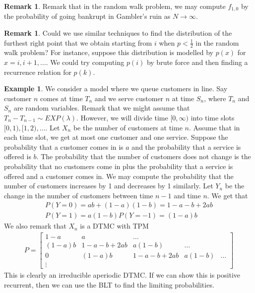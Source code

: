 \documentclass[11pt]{amsart}
\theoremstyle{definition}
\newtheorem{remark}[theorem]{Remark}
\newtheorem{example}[theorem]{Example}
\numberwithin{equation}{section}
\begin{document}
 \begin{remark}
     Remark that in the random walk problem, we may compute $f_{1,0}$ by the probability of going bankrupt in Gambler's ruin as $N\to\infty$.
 \end{remark}
 \begin{remark}
     Could we use similar techniques to find the distribution of the furthest right point that we obtain starting from $i$ when $p<\frac{1}{2}$ in the random walk problem? For instance, suppose this distribution is modelled by $p(x)$ for $x=i,i+1,\ldots$. We could try computing $p(i)$ by brute force and then finding a recurrence relation for $p(k)$.
 \end{remark}
 \begin{example}
     We consider a model where we queue customers in line. Say customer $n$ comes at time $T_n$ and we serve  customer $n$ at time $S_n$, where $T_n$ and $S_n$ are random variables. Remark that we might assume that $T_n-T_{n-1}\sim EXP(\lambda)$. However, we will divide time $[0,\infty)$ into time slots $[0,1),[1,2),\ldots$. Let $X_n$ be the number of customers at time $n$. Assume that in each time slot, we get at most one customer and one service. Suppose the probability that a customer comes in is $a$ and the probability that a service is offered is $b$. The probability that the number of customers does not change is the probability that no customers come in plus the probability that a service is offered and a customer comes in. We may compute the probability that the number of customers increases by 1 and decreases by 1 similarly. Let $Y_n$ be the change in the number of customers between time $n-1$ and time $n$. We get that
     \begin{align*}
         P(Y=0)=ab+(1-a)(1-b)=1-a-b+2ab\\
         P(Y=1)=a(1-b)
         P(Y=-1)=(1-a)b
     \end{align*}
     We also remark that $X_n$ is a DTMC with TPM
     \begin{align*}
         P=\begin{bmatrix}
             1-a & a & \ldots\\
             (1-a)b & 1-a-b+2ab & a(1-b) & \ldots\\
             0 & (1-a)b & 1-a-b+2ab & a(1-b) & \ldots\\
             \vdots
         \end{bmatrix}
     \end{align*}
     This is clearly an irreducible aperiodic DTMC. If we can show this is positive recurrent, then we can use the BLT to find the limiting probabilities. 


\end{example}
\end{document}
